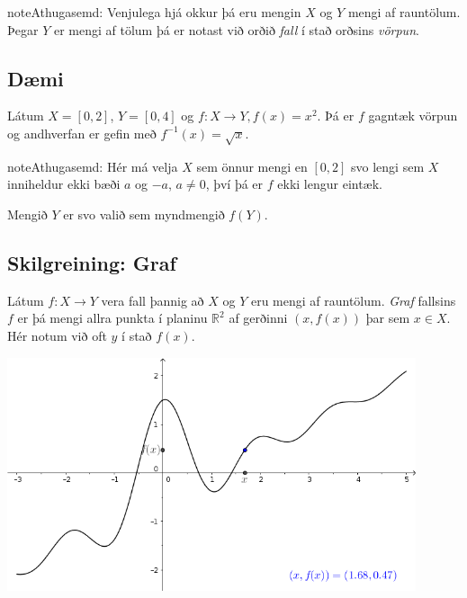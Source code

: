 \documentclass[b5paper,11pt,icelandic]{sphinxmanual}
\begin{document}

\begin{notice}{note}{Athugasemd:}
Venjulega hjá okkur þá eru mengin \(X\) og \(Y\)
mengi af rauntölum. Þegar \(Y\) er mengi af tölum þá er notast við
orðið \textit{fall} í stað orðsins \emph{vörpun}.
\end{notice}


\subsection{Dæmi}
\label{kafli01:index-9}\label{kafli01:id2}
Látum \(X=[0,2]\), \(Y=[0,4]\) og \(f:X \to Y, f(x) = x^2\).
Þá er \(f\) gagntæk vörpun og andhverfan er gefin með
\(f^{-1}(x) = \sqrt x\).


\begin{notice}{note}{Athugasemd:}
Hér má velja \(X\) sem önnur mengi en \([0,2]\) svo lengi sem
\(X\) inniheldur ekki bæði \(a\) og \(-a\), \(a\neq 0\),
því þá er \(f\) ekki lengur eintæk.

Mengið \(Y\) er svo valið sem myndmengið \(f(Y)\).
\end{notice}


\subsection{Skilgreining: Graf}
\label{kafli01:skilgreining-graf}
Látum \(f:X \to Y\) vera fall þannig að \(X\)
og \(Y\) eru mengi af rauntölum. \textit{Graf} fallsins \(f\) er þá
mengi allra punkta í planinu \(\mathbb{R}^2\) af gerðinni
\((x,f(x))\) þar sem \(x\in X\). Hér notum við oft \(y\) í stað
\(f(x)\).


\begin{center}
\includegraphics[width=12cm,keepaspectratio=true]{04_Graf_falls.png}
\end{center}
\end{document}
